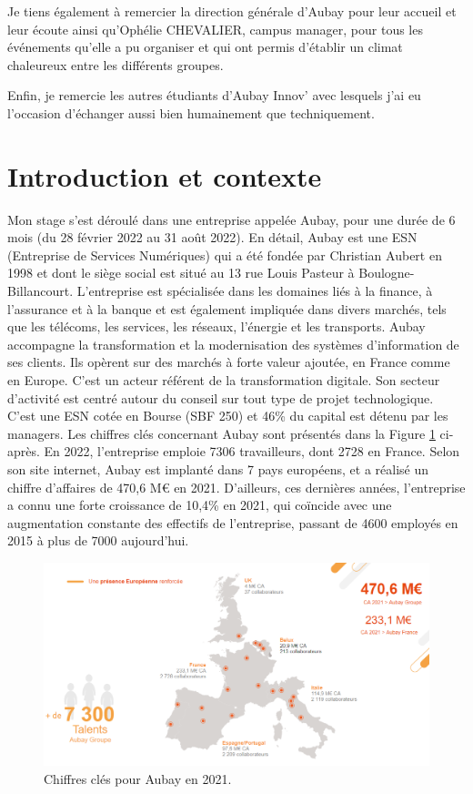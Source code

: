 \documentclass[11pt]{article}
\begin{document}
    Je tiens également à remercier la direction générale d'Aubay pour leur accueil et leur écoute ainsi qu'Ophélie CHEVALIER, campus manager, 
    pour tous les événements qu'elle a pu organiser et qui ont permis d'établir un climat chaleureux entre les différents groupes.
        
    Enfin, je remercie les autres étudiants d’Aubay Innov' avec lesquels j'ai eu l'occasion d'échanger aussi bien humainement que techniquement.

  \pagebreak
  \section{Introduction et contexte}    
  
  Mon stage s'est déroulé dans une entreprise appelée Aubay, pour une durée de 6 mois (du 28 février 2022 au 31 août 2022). 
  En détail, Aubay est une ESN (Entreprise de Services Numériques) qui a été fondée par Christian Aubert en 1998 et 
  dont le siège social est situé au 13 rue Louis Pasteur à Boulogne-Billancourt. L'entreprise est spécialisée dans les domaines 
  liés à la finance, à l'assurance et à la banque et est également impliquée dans divers marchés, tels que les télécoms, 
  les services, les réseaux, l'énergie et les transports. Aubay accompagne la transformation et la modernisation des systèmes 
  d’information de ses clients. Ils opèrent sur des marchés à forte valeur ajoutée, en France comme en Europe. C'est un acteur 
  référent de la transformation digitale. Son secteur d'activité est centré autour du conseil sur tout type de projet technologique.  
  C'est une ESN cotée en Bourse (SBF 250) et 46\% du capital est détenu par les managers. Les chiffres clés concernant Aubay 
  sont présentés dans la Figure \ref{fig:PA1} ci-après. En 2022, l'entreprise emploie 7306 travailleurs, dont 2728 en France. 
  Selon son site internet, Aubay est implanté dans 7 pays européens, et a réalisé un chiffre d'affaires de 470,6 M€ en 2021. 
  D'ailleurs, ces dernières années, l'entreprise a connu une forte croissance de 10,4\% en 2021, qui coïncide avec une augmentation 
  constante des effectifs de l'entreprise, passant de 4600 employés en 2015 à plus de 7000 aujourd'hui.
 
  \begin{figure}[hbt]  
    \includegraphics[width=\textwidth]{PresentationAubay1.png}    
    \caption{Chiffres clés pour Aubay en 2021.}
    \label{fig:PA1}
  \end{figure}  
  
\end{document}
